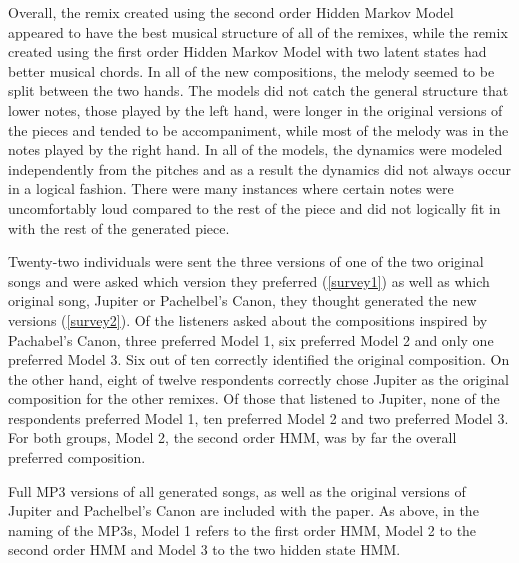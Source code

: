 \documentclass{article} %
\begin{document}
Overall, the remix created using the second order Hidden Markov Model appeared to have the best musical structure of all of the remixes, while the remix created using the first order Hidden Markov Model with two latent states had better musical chords. In all of the new compositions, the melody seemed to be split between the two hands. The models did not catch the general structure that lower notes, those played by the left hand, were longer in the original versions of the pieces and tended to be accompaniment, while most of the melody was in the notes played by the right hand. In all of the models, the dynamics were modeled independently from the pitches and as a result the dynamics did not always occur in a logical fashion. There were many instances where certain notes were uncomfortably loud compared to the rest of the piece and did not logically fit in with the rest of the generated piece. 

Twenty-two individuals were sent the three versions of one of the two original songs and were asked which version they preferred (\autoref{survey1}) as well as which original song, Jupiter or Pachelbel's Canon, they thought generated the new versions (\autoref{survey2}). Of the listeners asked about the compositions inspired by Pachabel's Canon, three preferred Model 1, six preferred Model 2 and only one preferred Model 3. Six out of ten correctly identified the original composition. On the other hand, eight of twelve respondents correctly chose Jupiter as the original composition for the other remixes. Of those that listened to Jupiter, none of the respondents preferred Model 1, ten preferred Model 2 and two preferred Model 3. For both groups, Model 2, the second order HMM,  was by far the overall preferred composition.  

Full MP3 versions of all generated songs, as well as the original versions of Jupiter and Pachelbel's Canon are included with the paper.  As above, in the naming of the MP3s, Model 1 refers to the first order HMM, Model 2 to the second order HMM and Model 3 to the two hidden state HMM.
\end{document}
